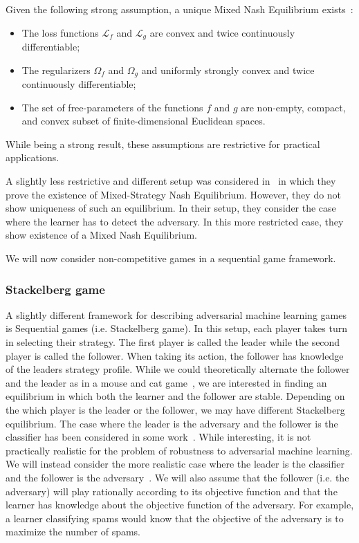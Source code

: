 Given the following strong assumption, a unique Mixed Nash Equilibrium exists~\cite{bruckner_static_aml}:
\begin{itemize}
    \item The loss functions $\mathcal{L}_f$ and $\mathcal{L}_g$ are convex and twice continuously differentiable;
    \item The regularizers $\Omega_f$ and $\Omega_g$ and uniformly strongly convex and twice continuously differentiable;
    \item The set of free-parameters of the functions $f$ and $g$ are non-empty, compact, and convex subset of finite-dimensional Euclidean spaces.
\end{itemize}
While being a strong result, these assumptions are restrictive for practical applications. 

A slightly less restrictive and different setup was considered in~\cite{dritsoula_game_ml} in which they prove the existence of Mixed-Strategy Nash Equilibrium. However, they do not show uniqueness of such an equilibrium. In their setup, they consider the case where the learner has to detect the adversary. In this more restricted case, they show existence of a Mixed Nash Equilibrium.

We will now consider non-competitive games in a sequential game framework.

\subsubsection{Stackelberg game} A slightly different framework for describing adversarial machine learning games is Sequential games (i.e. Stackelberg game). In this setup, each player takes turn in selecting their strategy. The first player is called the leader while the second player is called the follower. When taking its action, the follower has knowledge of the leaders strategy profile. While we could theoretically alternate the follower and the leader as in a mouse and cat game~\cite{barreno_security_ml}, we are interested in finding an equilibrium in which both the learner and the follower are stable. Depending on the which player is the leader or the follower, we may have different Stackelberg equilibrium. The case where the leader is the adversary and the follower is the classifier has been considered in some work~\cite{murat_adversarial_classification,liu_game_theoretical_aml}. While interesting, it is not practically realistic for the problem of robustness to adversarial machine learning. We will instead consider the more realistic case where the leader is the classifier and the follower is the adversary~\cite{bruckner_stackelberg}. We will also assume that the follower (i.e. the adversary) will play rationally according to its objective function and that the learner has knowledge about the objective function of the adversary. For example, a learner classifying spams would know that the objective of the adversary is to maximize the number of spams.

